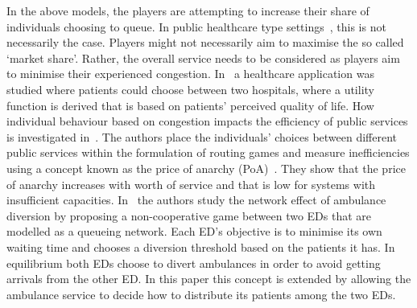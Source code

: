 In the above models, the players are attempting to increase their share of 
individuals choosing to queue.
In public healthcare type settings~\cite{knight2013selfish}, this is not 
necessarily the case. 
Players might not necessarily aim to maximise the so called `market share'.
Rather, the overall service needs to be considered as players aim to minimise
their experienced congestion.
In~\cite{sadat2015can} a healthcare application was studied where patients 
could choose between two hospitals, where a utility function is derived that is
based on patients' perceived quality of life.
How individual behaviour based on congestion impacts the efficiency of public 
services is investigated in~\cite{knight2013selfish}.
The authors place the individuals' choices between different public services 
within the formulation of routing games and measure inefficiencies using a 
concept known as the price of anarchy (PoA)~\cite{koutsoupias1999worst}.
They show that the price of anarchy increases with worth of service and that is
low for systems with insufficient capacities.
In~\cite{deo2011centralized} the authors study the network effect of ambulance 
diversion by proposing a non-cooperative game between two EDs that are modelled
as a queueing network.
Each ED's objective is to minimise its own waiting time and chooses a diversion
threshold based on the patients it has.
In equilibrium both EDs choose to divert ambulances in order to avoid getting
arrivals from the other ED.
In this paper this concept is extended by allowing the ambulance service to 
decide how to distribute its patients among the two EDs.

